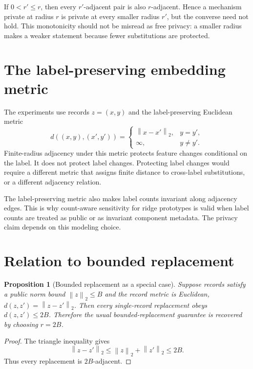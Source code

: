 \documentclass[11pt,a4paper]{report}
\theoremstyle{plain}
\newtheorem{proposition}[theorem]{Proposition}
\theoremstyle{definition}
\theoremstyle{remark}
\newcommand{\norm}[1]{\left\lVert #1\right\rVert}
\begin{document}
If $0<r'\le r$, then every $r'$-adjacent pair is also $r$-adjacent.  Hence a mechanism private at radius $r$ is private at every smaller radius $r'$, but the converse need not hold.  This monotonicity should not be misread as free privacy: a smaller radius makes a weaker statement because fewer substitutions are protected.

\section{The label-preserving embedding metric}
\label{sec:label-preserving-metric}

The experiments use records $z=(x,y)$ and the label-preserving Euclidean metric
\begin{equation}
\label{eq:label-preserving-metric-main}
 d((x,y),(x',y'))
 =
 \begin{cases}
 \norm{x-x'}_2, & y=y',\\
 \infty, & y\ne y'.
 \end{cases}
\end{equation}
Finite-radius adjacency under this metric protects feature changes conditional on the label.  It does not protect label changes.  Protecting label changes would require a different metric that assigns finite distance to cross-label substitutions, or a different adjacency relation.

The label-preserving metric also makes label counts invariant along adjacency edges.  This is why count-aware sensitivity for ridge prototypes is valid when label counts are treated as public or as invariant component metadata.  The privacy claim depends on this modeling choice.

\section{Relation to bounded replacement}
\label{sec:bounded-replacement}

\begin{proposition}[Bounded replacement as a special case]
\label{prop:bounded-replacement-special}
Suppose records satisfy a public norm bound $\norm{z}_2\le B$ and the record metric is Euclidean, $d(z,z')=\norm{z-z'}_2$.  Then every single-record replacement obeys $d(z,z')\le 2B$.  Therefore the usual bounded-replacement guarantee is recovered by choosing $r=2B$.
\end{proposition}

\begin{proof}
The triangle inequality gives
\[
\norm{z-z'}_2\le \norm{z}_2+\norm{z'}_2\le 2B.
\]
Thus every replacement is $2B$-adjacent.
\end{proof}
\end{document}
